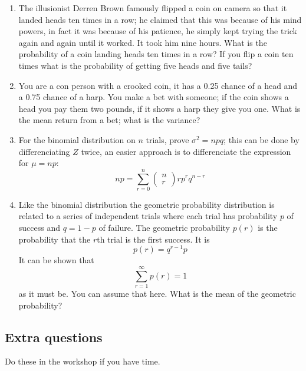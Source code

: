 \documentclass[11pt,a4paper]{scrartcl}
\begin{document}
\begin{enumerate}

\item The illusionist Derren Brown famously flipped a coin on camera
  so that it landed heads ten times in a row; he claimed that this was
  because of his mind powers, in fact it was because of his patience,
  he simply kept trying the trick again and again until it
  worked. It took him nine hours. What is the probability of a coin landing heads ten times in
  a row? If you flip a coin ten times what is the probability of
  getting five heads and five tails?

\item You are a con person with a crooked coin, it has a 0.25 chance
  of a head and a 0.75 chance of a harp. You make a bet with someone; if
  the coin shows a head you pay them two pounds, if it shows a harp
  they give you one. What is the mean return from a bet; what is the variance?

\item For the binomial distribution on $n$ trials, prove
  $\sigma^2=npq$; this can be done by differenciating $Z$ twice, an
  easier approach is to differenciate the expression for $\mu=np$:
  \begin{equation}
    np= \sum_{r=0}^n \left(\begin{array}{c}n\\r\end{array}\right)rp^rq^{n-r}
  \end{equation}
  
\item Like the binomial distribution the geometric probability
  distribution is related to a series of independent trials where each
  trial has probability $p$ of success and $q=1-p$ of failure. The
  geometric probability $p(r)$ is the probability that the $r$th trial
  is the first success. It is
\begin{equation}
p(r)=q^{r-1}p
\end{equation}
It can be shown that 
\begin{equation}
\sum_{r=1}^\infty p(r)=1
\end{equation}
as it must be. You can assume that here. What is the mean of the geometric probability?



\end{enumerate}

\subsection*{Extra questions}
Do these in the workshop if you have time.
\end{document}
